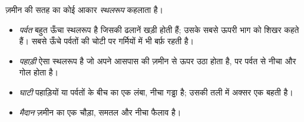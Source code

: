 \begin{definition}[स्थलरूप]\label{def:g1:landscapes-around-us:landform}
ज़मीन की सतह का कोई आकार \emph{स्थलरूप} कहलाता है।
\begin{itemize}
  \item \emph{पर्वत} बहुत ऊँचा स्थलरूप है जिसकी ढलानें खड़ी
        होती हैं; उसके सबसे ऊपरी भाग को शिखर कहते हैं। सबसे ऊँचे पर्वतों
        की चोटी पर गर्मियों में भी बर्फ़ रहती है।
  \item \emph{पहाड़ी} ऐसा स्थलरूप है जो अपने आसपास की ज़मीन से
        ऊपर उठा होता है, पर पर्वत से नीचा और गोल होता है।
  \item \emph{घाटी} पहाड़ियों या पर्वतों के बीच का एक लंबा, नीचा
        गड्ढा है; उसकी तली में अक्सर एक  बहती है।
  \item \emph{मैदान} ज़मीन का एक चौड़ा, समतल और नीचा फैलाव है।
\end{itemize}
\end{definition}

